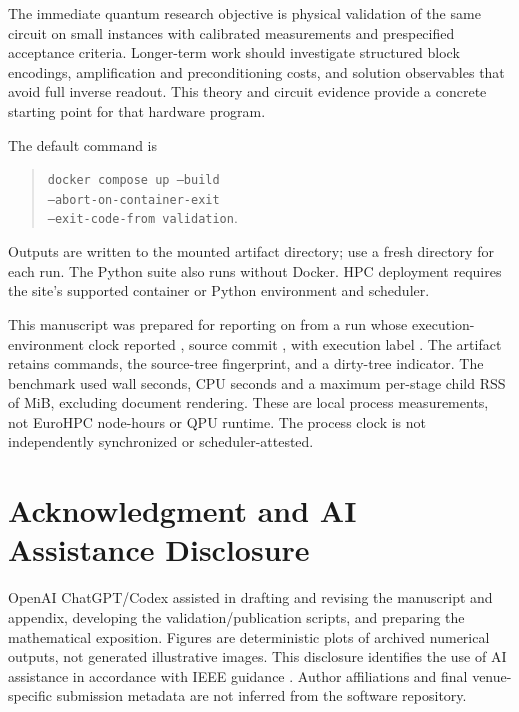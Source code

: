 \documentclass[journal]{IEEEtran}
\begin{document}
The immediate quantum research objective is physical validation of the
same circuit on small instances with calibrated measurements and
prespecified acceptance criteria. Longer-term work should investigate
structured block encodings, amplification and preconditioning costs,
and solution observables that avoid full inverse readout. This theory
and circuit evidence provide a concrete starting point for that hardware
program.

The default command is
\begin{quote}\small\texttt{docker compose up --build}\\
\texttt{--abort-on-container-exit}\\
\texttt{--exit-code-from validation}.
\end{quote}
Outputs are written to the mounted artifact directory; use a fresh directory
for each run. The Python suite also runs without Docker. HPC deployment
requires the site's supported container or Python environment and scheduler.

This manuscript was prepared for reporting on \ReportDate{} from a run whose
execution-environment clock reported \RunDate{}, source commit
\texttt{\SourceCommit}, with execution label \texttt{\RunContext}.
The artifact retains commands, the source-tree fingerprint, and a dirty-tree
indicator. The benchmark used \SuiteWallSeconds{} wall seconds,
\SuiteCPUSeconds{} CPU seconds and a maximum per-stage child RSS of
\SuitePeakMiB{} MiB, excluding document rendering. These are local process
measurements, not EuroHPC node-hours or QPU runtime. The process clock is
not independently synchronized or scheduler-attested.

\section*{Acknowledgment and AI Assistance Disclosure}
OpenAI ChatGPT/Codex assisted in drafting and revising the manuscript and
appendix, developing the validation/publication scripts, and preparing
the mathematical exposition. Figures are deterministic plots of archived
numerical outputs, not generated illustrative images. This disclosure
identifies the use of AI assistance in accordance with IEEE guidance
\cite{ieeeai}. Author affiliations and final venue-specific submission
metadata are not inferred from the software repository.



\end{document}
